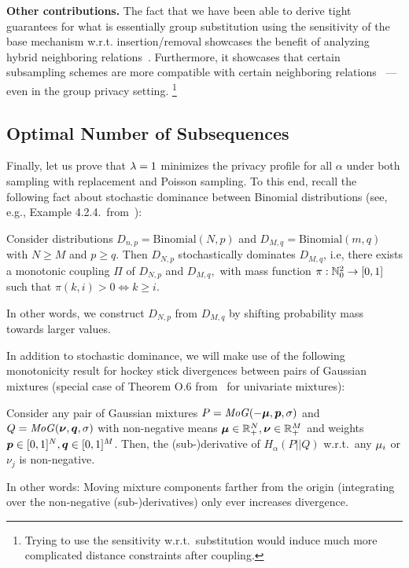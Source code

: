 \textbf{Other contributions.}
The fact that we have been able to derive tight guarantees for what is essentially group substitution
using the sensitivity of the base mechanism w.r.t. insertion/removal showcases the benefit
of analyzing hybrid neighboring relations~\cite{balle2018privacy}.
Furthermore, it showcases that certain subsampling schemes are more compatible with certain neighboring relations~\cite{lebeda2024avoiding} --- even in the group privacy setting. 
\footnote{Trying to use the sensitivity w.r.t.\ substitution would induce much more complicated distance constraints after coupling.} 

\subsection{Optimal Number of Subsequences}\label{appendix:proofs_deterministic_top_monotonicity}
Finally, let us prove that $\lambda = 1$ minimizes the privacy profile for all $\alpha$ under both sampling with replacement and Poisson sampling.
To this end, recall the following fact about stochastic dominance between Binomial distributions (see, e.g., Example 4.2.4.\ from~\cite{roch_mdp_2024}):
\begin{lemma}\label{lemma:binomial_dominance}
    Consider distributions $D_{n,p} = \mathrm{Binomial}(N, p)$
    and $D_{M,q} = \mathrm{Binomial}(m, q)$
    with $N \geq M$ and $p \geq q$. 
    Then $D_{N,p}$ stochastically dominates $D_{M,q}$, i.e,
    there exists a monotonic coupling $\Pi$ of $D_{N,p}$ and $D_{M,q}, $ with mass function $\pi : {\mathbb{N}}_0^2 \rightarrow [0,1]$
    such that
    $\pi(k,i) > 0 \iff k \geq i$.
\end{lemma}
In other words, we construct $D_{N,p}$ from $D_{M,q}$ by shifting probability mass towards larger values.

In addition to stochastic dominance, we will make use of the following monotonicity result for hockey stick divergences between pairs of Gaussian mixtures (special case of Theorem O.6 from~\cite{schuchardt2024unified} for univariate mixtures):
\begin{lemma}\label{lemma:gaussian_mean_monotonicity}
    Consider any pair of Gaussian mixtures
    $P = \mathit{MoG}(-{\bm{\mu}}, {\bm{p}}, \sigma)$
    and
    $Q = \mathit{MoG}({\bm{\nu}}, {\bm{q}}, \sigma)$
    with non-negative means ${\bm{\mu}} \in {\mathbb{R}}_+^N, {\bm{\nu}} \in {\mathbb{R}}_+^M$
    and weights
    ${\bm{p}} \in [0,1]^N, {\bm{q}} \in [0,1]^M$. 
    Then, the (sub-)derivative of $H_\alpha(P || Q)$ w.r.t.\ any ${\mu}_i$ or $\nu_j$ is non-negative.
\end{lemma}
In other words: Moving mixture components farther from the origin (integrating over the non-negative (sub-)derivatives) only ever increases divergence.

